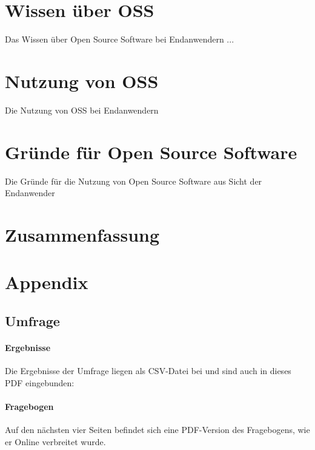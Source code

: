 \documentclass[a4paper]{article}
\begin{document}
    \section{Wissen über OSS}
        Das Wissen über Open Source Software bei Endanwendern ...
            
    \section{Nutzung von OSS}
        Die Nutzung von OSS bei Endanwendern
    
    \section{Gründe für Open Source Software}
        Die Gründe für die Nutzung von Open Source Software aus Sicht der Endanwender
    
    \section{Zusammenfassung}
    
    \clearpage
    \section{Appendix}
        \printglossary[type=\acronymtype]
        \printglossary
        
        \clearpage
        \nocite{*}
        \printbibliography
        
        \clearpage
        
        \subsection{Umfrage}
            \paragraph{Ergebnisse}
                Die Ergebnisse der Umfrage liegen als CSV-Datei bei und sind auch in dieses PDF eingebunden: 
            \paragraph{Fragebogen}
                Auf den nächsten vier Seiten befindet sich eine PDF-Version des Fragebogens, wie er Online verbreitet wurde.
                
\end{document}
